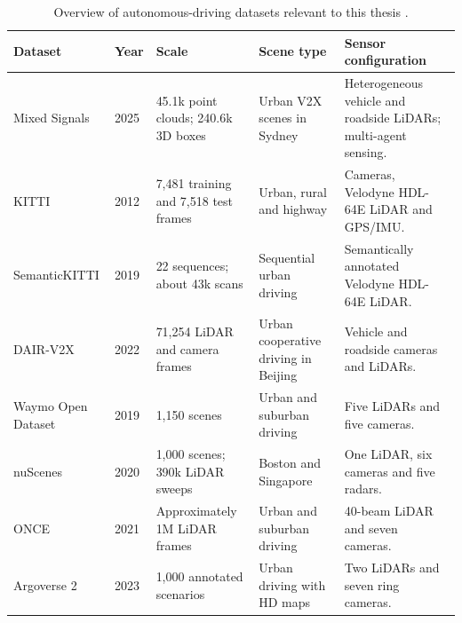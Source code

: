 \documentclass[12pt,a4paper]{article}
\begin{document}
\begin{table}[htbp]
    \centering
    \caption{Overview of autonomous-driving datasets relevant to this thesis \cite{bib_ref_12,bib_ref_14,bib_ref_15,bib_ref_16,bib_ref_1,bib_ref_18,bib_ref_19,bib_ref_20}.}
    \label{tab:dataset-overview}
    \small
    \setlength{\tabcolsep}{3pt}
    \sloppy
    \renewcommand{\arraystretch}{1.15}
    \begin{tabularx}{\textwidth}{|p{2.3cm}|p{1.0cm}|p{2.5cm}|p{2.6cm}|Y|}
        \hline
        \textbf{Dataset} & \textbf{Year} & \textbf{Scale} & \textbf{Scene type} & \textbf{Sensor configuration} \\
        \hline
        Mixed Signals & 2025 & 45.1k point clouds; 240.6k 3D boxes & Urban V2X scenes in Sydney & Heterogeneous vehicle and roadside LiDARs; multi-agent sensing. \\
        \hline
        KITTI & 2012 & 7,481 training and 7,518 test frames & Urban, rural and highway & Cameras, Velodyne HDL-64E LiDAR and GPS/IMU. \\
        \hline
        SemanticKITTI & 2019 & 22 sequences; about 43k scans & Sequential urban driving & Semantically annotated Velodyne HDL-64E LiDAR. \\
        \hline
        DAIR-V2X & 2022 & 71,254 LiDAR and camera frames & Urban cooperative driving in Beijing & Vehicle and roadside cameras and LiDARs. \\
        \hline
        Waymo Open Dataset & 2019 & 1,150 scenes & Urban and suburban driving & Five LiDARs and five cameras. \\
        \hline
        nuScenes & 2020 & 1,000 scenes; 390k LiDAR sweeps & Boston and Singapore & One LiDAR, six cameras and five radars. \\
        \hline
        ONCE & 2021 & Approximately 1M LiDAR frames & Urban and suburban driving & 40-beam LiDAR and seven cameras. \\
        \hline
        Argoverse 2 & 2023 & 1,000 annotated scenarios & Urban driving with HD maps & Two LiDARs and seven ring cameras. \\
        \hline
    \end{tabularx}
\end{table}
\end{document}
